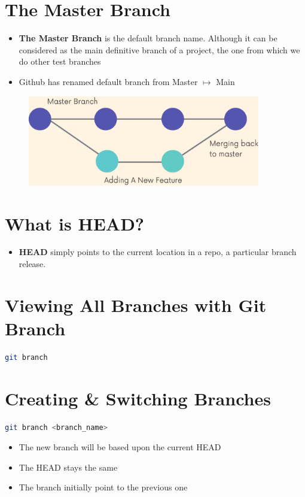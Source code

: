 \documentclass{report}
\newcommand{\warning}{
	{\fontencoding{U}\fontfamily{futs}\selectfont\char 66\relax}
}
\begin{document}
\section{The Master Branch}

\begin{itemize}
	\item \textbf{The Master Branch} is the default branch name. Although it can be considered as the main definitive branch of a project, the one from which we do other test branches 
	\item Github has renamed default branch from Master $\mapsto$ Main
\end{itemize}

\begin{figure}[H] 
\centering 
\includegraphics[width=4in]{screenshots/2022-06-28T00-30-17Z.png} 
\end{figure}


\section{What is HEAD?}

\begin{itemize}
	\item \textbf{HEAD} simply points to the current location in a repo, a particular branch release.
\end{itemize}


\section{Viewing All Branches with Git Branch}

\begin{tcolorbox}[colback=backcolour]
\begin{lstlisting}[language=bash]
git branch
\end{lstlisting}
\end{tcolorbox}


\section{Creating \& Switching Branches}
\begin{tcolorbox}[title=Creating Branches,colback=backcolour]
\begin{lstlisting}[language=bash]
git branch <branch_name>
\end{lstlisting}
\end{tcolorbox}
\begin{itemize}
	\item \warning The new branch will be based upon the current HEAD
	\item \warning The HEAD stays the same 
	\item The branch initially point to the previous one
\end{itemize}
\end{document}

